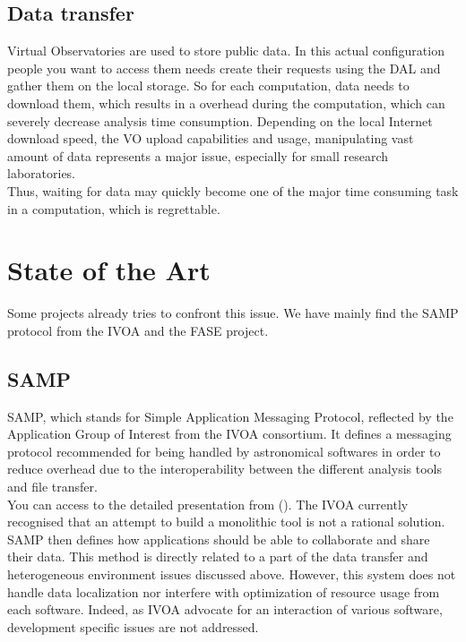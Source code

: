 \documentclass[11pt, twoside]{article}
\begin{document}
		\subsection{Data transfer}
			Virtual Observatories are used to store public data. In this actual configuration people you want to access them needs create their requests using the DAL and gather them on the local storage.
			So for each computation, data needs to download them, which results in a overhead during the computation, which can severely decrease analysis time consumption.
			Depending on the local Internet download speed, the VO upload capabilities and usage, manipulating vast amount of data represents a major issue, especially for small research laboratories.
			\\
			Thus, waiting for data may quickly become one of the major time consuming task in a computation, which is regrettable.

	\section{State of the Art}
		Some projects already tries to confront this issue. We have mainly find the SAMP protocol from the IVOA and the FASE project.
		
		\subsection{SAMP}
			SAMP, which stands for Simple Application Messaging Protocol, reflected by the Application Group of Interest from the IVOA consortium.
			It defines a messaging protocol recommended for being handled by astronomical softwares in order to reduce overhead due to the interoperability between the different analysis tools and file transfer.
			\\
			You can access to the detailed presentation from (\cite{Taylor}). The IVOA currently recognised that an attempt to build a monolithic tool is not a rational solution. SAMP then defines how applications should be able to collaborate and share their data.
			This method is directly related to a part of the data transfer and heterogeneous environment issues discussed above.
			However, this system does not handle data localization nor interfere with optimization of resource usage from each software.
			Indeed, as IVOA advocate for an interaction of various software, development specific issues are not addressed. 
			
\end{document}
